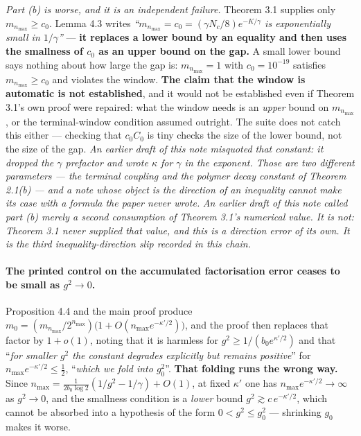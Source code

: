 \documentclass[11pt]{article}
\begin{document}
\emph{Part (b) is worse, and it is an independent failure.} Theorem 3.1 supplies only
$m_{n_{\max}}\ge c_0$. Lemma 4.3 writes
\emph{``$m_{n_{\max}}=c_0=(\gamma N_c/8)e^{-K/\gamma}$ is exponentially small in
$1/\gamma$''} --- \textbf{it replaces a lower bound by an equality and then
uses the smallness of $c_0$ as an upper bound on the gap.} A small lower bound says
nothing about how large the gap is: $m_{n_{\max}}=1$ with $c_0=10^{-19}$ satisfies
$m_{n_{\max}}\ge c_0$ and violates the window. \textbf{The claim that the window is
automatic is not established}, and it would not be established even if Theorem 3.1's
own proof were repaired: what the window needs is an \emph{upper} bound on
$m_{n_{\max}}$, or the terminal-window condition assumed outright. The suite does not
catch this either --- checking that $c_0C_0$ is tiny checks the size of the lower
bound, not the size of the gap. \emph{An earlier draft of this note misquoted that
constant: it dropped the $\gamma$ prefactor and wrote $\kappa$ for $\gamma$ in the
exponent. Those are two different parameters --- the terminal coupling and the polymer
decay constant of Theorem 2.1(b) --- and a note whose object is the direction of an
inequality cannot make its case with a formula the paper never wrote.} \emph{An earlier draft of this note called part (b)
merely a second consumption of Theorem 3.1's numerical value. It is not: Theorem 3.1
never supplied that value, and this is a direction error of its own. It is the third
inequality-direction slip recorded in this chain.}

\paragraph{The printed control on the accumulated factorisation error ceases to be
small as $g^2\to0$.} Proposition 4.4
and the main proof produce
$m_0=(m_{n_{\max}}/2^{n_{\max}})\bigl(1+O(n_{\max}e^{-\kappa'/2})\bigr)$, and the
proof then replaces that factor by $1+o(1)$, noting that it is harmless for
$g^2\ge1/(b_0e^{\kappa'/2})$ and that ``\emph{for smaller $g^2$ the constant degrades
explicitly but remains positive}'' for $n_{\max}e^{-\kappa'/2}\le\frac12$,
``\emph{which we fold into $g_0^2$}''. \textbf{That folding runs the wrong way.}
Since $n_{\max}=\frac{1}{2b_0\log2}(1/g^2-1/\gamma)+O(1)$, at fixed $\kappa'$ one has
$n_{\max}e^{-\kappa'/2}\to\infty$ as $g^2\to0$, and the smallness condition is a
\emph{lower} bound $g^2\gtrsim c\,e^{-\kappa'/2}$, which cannot be absorbed into a
hypothesis of the form $0<g^2\le g_0^2$ --- shrinking $g_0$ makes it worse.
\end{document}
